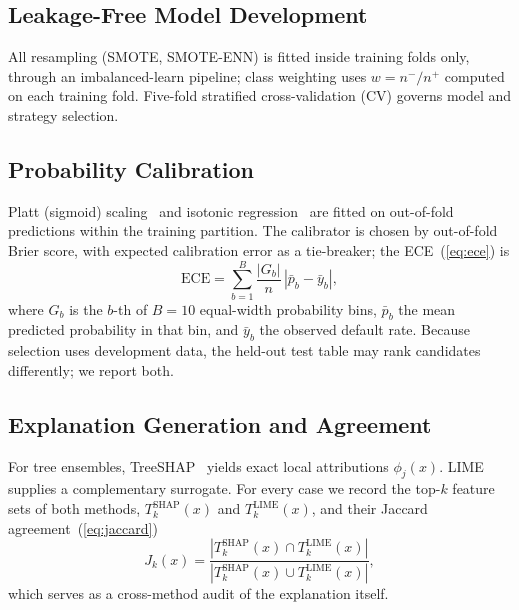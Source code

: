 \documentclass[journal]{IEEEtran}
\begin{document}
\subsection{Leakage-Free Model Development}
All resampling (SMOTE, SMOTE-ENN) is fitted inside training folds only, through
an imbalanced-learn pipeline; class weighting uses $w=n^-/n^+$ computed on each
training fold. Five-fold stratified cross-validation (CV) governs model and
strategy selection.

\subsection{Probability Calibration}
Platt (sigmoid) scaling~\cite{platt1999probabilistic} and isotonic
regression~\cite{zadrozny2002transforming} are fitted on out-of-fold
predictions within the training partition. The calibrator is chosen by
out-of-fold Brier score, with expected calibration error as a tie-breaker; the
ECE~(\ref{eq:ece}) is
\begin{equation}
\mathrm{ECE}=\sum_{b=1}^{B}\frac{|G_b|}{n}\,
  \left|\bar{p}_b-\bar{y}_b\right|,
\label{eq:ece}
\end{equation}
where $G_b$ is the $b$-th of $B=10$ equal-width probability bins, $\bar{p}_b$
the mean predicted probability in that bin, and $\bar{y}_b$ the observed
default rate. Because selection uses development data, the held-out test table
may rank candidates differently; we report both.

\subsection{Explanation Generation and Agreement}
For tree ensembles, TreeSHAP~\cite{lundberg2020local} yields exact local
attributions $\phi_j(x)$. LIME~\cite{ribeiro2016why} supplies a complementary
surrogate. For every case we record the top-$k$ feature sets of both methods,
$T^{\mathrm{SHAP}}_k(x)$ and $T^{\mathrm{LIME}}_k(x)$, and their Jaccard
agreement~(\ref{eq:jaccard})
\begin{equation}
J_k(x)=\frac{\left|T^{\mathrm{SHAP}}_k(x)\cap T^{\mathrm{LIME}}_k(x)\right|}
             {\left|T^{\mathrm{SHAP}}_k(x)\cup T^{\mathrm{LIME}}_k(x)\right|},
\label{eq:jaccard}
\end{equation}
which serves as a cross-method audit of the explanation itself.
\end{document}
